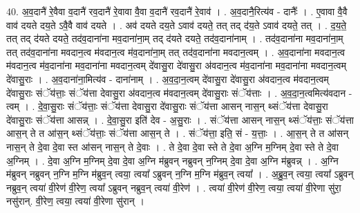 \documentclass[17pt]{extarticle}
\begin{document}
40. अ॒व॒दानै॑ रे॒वैवा व॒दानै॑ रव॒दानै॑ रे॒वावा वै॒वा व॒दानै॑ रव॒दानै॑ रे॒वाव॑ । . अ॒व॒दानै॒रित्य॑व - दानैः᳚ । . ए॒वावा वै॒वै वाव॑ दयते दय॒ते ऽवै॒वै वाव॑ दयते । . अव॑ दयते दय॒ते ऽवाव॑ दयते॒ तत् तद् द॑य॒ते ऽवाव॑ दयते॒ तत् । . द॒य॒ते॒ तत् तद् द॑यते दयते॒ तद॑व॒दाना॑ना मव॒दाना॑ना॒म् तद् द॑यते दयते॒ तद॑व॒दाना॑नाम् । . तद॑व॒दाना॑ना मव॒दाना॑ना॒म् तत् तद॑व॒दाना॑ना मवदान॒त्व म॑वदान॒त्व म॑व॒दाना॑ना॒म् तत् तद॑व॒दाना॑ना मवदान॒त्वम् । . अ॒व॒दाना॑ना मवदान॒त्व म॑वदान॒त्व म॑व॒दाना॑ना मव॒दाना॑ना मवदान॒त्वम् दे॑वासु॒रा दे॑वासु॒रा अ॑वदान॒त्व म॑व॒दाना॑ना मव॒दाना॑ना मवदान॒त्वम् दे॑वासु॒राः । . अ॒व॒दाना॑ना॒मित्य॑व - दाना॑नाम् । . अ॒व॒दा॒न॒त्वम् दे॑वासु॒रा दे॑वासु॒रा अ॑वदान॒त्व म॑वदान॒त्वम् दे॑वासु॒राः संॅय॑त्ताः॒ संॅय॑त्ता देवासु॒रा अ॑वदान॒त्व म॑वदान॒त्वम् दे॑वासु॒राः संॅय॑त्ताः । . अ॒व॒दा॒न॒त्वमित्य॑वदान - त्वम् । . दे॒वा॒सु॒राः संॅय॑त्ताः॒ संॅय॑त्ता देवासु॒रा दे॑वासु॒राः संॅय॑त्ता आसन् नास॒न् थ्संॅय॑त्ता देवासु॒रा दे॑वासु॒राः संॅय॑त्ता आसन्न् । . दे॒वा॒सु॒रा इति॑ देव - अ॒सु॒राः । . संॅय॑त्ता आसन् नास॒न् थ्संॅय॑त्ताः॒ संॅय॑त्ता आस॒न् ते त आ॑स॒न् थ्संॅय॑त्ताः॒ संॅय॑त्ता आस॒न् ते । . संॅय॑त्ता॒ इति॒ सं - य॒त्ताः॒ । . आ॒स॒न् ते त आ॑सन् नास॒न् ते दे॒वा दे॒वा स्त आ॑सन् नास॒न् ते दे॒वाः । . ते दे॒वा दे॒वा स्ते ते दे॒वा अ॒ग्नि म॒ग्निम् दे॒वा स्ते ते दे॒वा अ॒ग्निम् । . दे॒वा अ॒ग्नि म॒ग्निम् दे॒वा दे॒वा अ॒ग्नि म॑ब्रुवन् नब्रुवन् न॒ग्निम् दे॒वा दे॒वा अ॒ग्नि म॑ब्रुवन्न् । . अ॒ग्नि म॑ब्रुवन् नब्रुवन् न॒ग्नि म॒ग्नि म॑ब्रुव॒न् त्वया॒ त्वया᳚ ऽब्रुवन् न॒ग्नि म॒ग्नि म॑ब्रुव॒न् त्वया᳚ । . अ॒ब्रु॒व॒न् त्वया॒ त्वया᳚ ऽब्रुवन् नब्रुव॒न् त्वया॑ वी॒रेण॑ वी॒रेण॒ त्वया᳚ ऽब्रुवन् नब्रुव॒न् त्वया॑ वी॒रेण॑ । . त्वया॑ वी॒रेण॑ वी॒रेण॒ त्वया॒ त्वया॑ वी॒रेणा सु॑रा॒ नसु॑रान्. वी॒रेण॒ त्वया॒ त्वया॑ वी॒रेणा सु॑रान् । \newline
\end{document}

